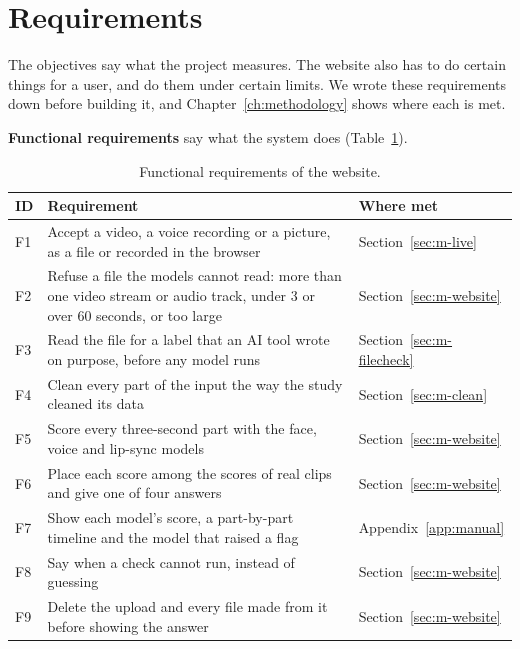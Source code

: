 \section{Requirements}
\label{sec:requirements}

The objectives say what the project measures. The website also has to do
certain things for a user, and do them under certain limits. We wrote these
requirements down before building it, and Chapter~\ref{ch:methodology} shows
where each is met.

\textbf{Functional requirements} say what the system does
(Table~\ref{tab:req-functional}).

\begin{table}[ht]
    \centering
    \small
    \caption{Functional requirements of the website.}
    \label{tab:req-functional}
    \begin{tabularx}{\textwidth}{@{}l >{\raggedright\arraybackslash}X l@{}}
        \toprule
        \textbf{ID} & \textbf{Requirement} & \textbf{Where met} \\
        \midrule
        F1 & Accept a video, a voice recording or a picture, as a file or recorded in the browser & Section~\ref{sec:m-live} \\
        F2 & Refuse a file the models cannot read: more than one video stream or audio track, under 3 or over 60 seconds, or too large & Section~\ref{sec:m-website} \\
        F3 & Read the file for a label that an AI tool wrote on purpose, before any model runs & Section~\ref{sec:m-filecheck} \\
        F4 & Clean every part of the input the way the study cleaned its data & Section~\ref{sec:m-clean} \\
        F5 & Score every three-second part with the face, voice and lip-sync models & Section~\ref{sec:m-website} \\
        F6 & Place each score among the scores of real clips and give one of four answers & Section~\ref{sec:m-website} \\
        F7 & Show each model's score, a part-by-part timeline and the model that raised a flag & Appendix~\ref{app:manual} \\
        F8 & Say when a check cannot run, instead of guessing & Section~\ref{sec:m-website} \\
        F9 & Delete the upload and every file made from it before showing the answer & Section~\ref{sec:m-website} \\
        \bottomrule
    \end{tabularx}
\end{table}

